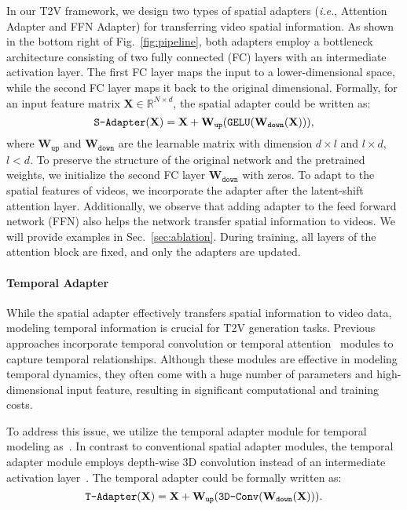 In our T2V framework, we design two types of spatial adapters (\emph{i.e.}, Attention Adapter and FFN Adapter) for transferring video spatial information. As shown in the bottom right of Fig.~\ref{fig:pipeline}, both adapters employ a bottleneck architecture consisting of two fully connected (FC) layers with an intermediate activation layer. The first FC layer maps the input to a lower-dimensional space, while the second FC layer maps it back to the original dimensional. Formally, for an input feature matrix $\mathbf{X}\in \mathbb{R}^{N\times d} $, the spatial adapter could be written as:
\begin{equation}
    \texttt{S\text{-}Adapter}(\mathbf{X}) = \mathbf{X} + \mathbf{W}_{\texttt{up}}(\texttt{GELU}(\mathbf{W}_{\texttt{down}}(\mathbf{X}))),
\end{equation}
where $\mathbf{W}_{\texttt{up}}$ and $\mathbf{W}_{\texttt{down}}$ are the learnable matrix with dimension $d \times l$ and $l \times d$, $l<d$.
To preserve the structure of the original network and the pretrained weights, we initialize the second FC layer $\mathbf{W}_{\texttt{down}}$ with zeros. To adapt to the spatial features of videos, we incorporate the adapter after the latent-shift attention layer. Additionally, we observe that adding adapter to the feed forward network (FFN) also helps the network transfer spatial information to videos. We will provide examples in Sec.~\ref{sec:ablation}. During training, all layers of the attention block are fixed, and only the adapters are updated.

\paragraph{Temporal Adapter}
While the spatial adapter effectively transfers spatial information to video data, modeling temporal information is crucial for T2V generation tasks. Previous approaches incorporate temporal convolution or temporal attention~\cite{videoLDM,videofactory, singer2022make} modules to capture temporal relationships. Although these modules are effective in modeling temporal dynamics, they often come with a huge number of parameters and high-dimensional input feature, resulting in significant computational and training costs.

To address this issue, we utilize the temporal adapter module for temporal modeling as~\cite{multimodaladapter, st-adapter}. In contrast to conventional spatial adapter modules, the temporal adapter module employs depth-wise 3D convolution instead of an intermediate activation layer~\cite{GELU}. The temporal adapter could be formally written as:
\begin{equation}
    \texttt{T\text{-}Adapter}(\mathbf{X}) = \mathbf{X} + \mathbf{W}_{\texttt{up}} (\texttt{3D-Conv}(\mathbf{W}_{\texttt{down}}(\mathbf{X}))).
\end{equation}

